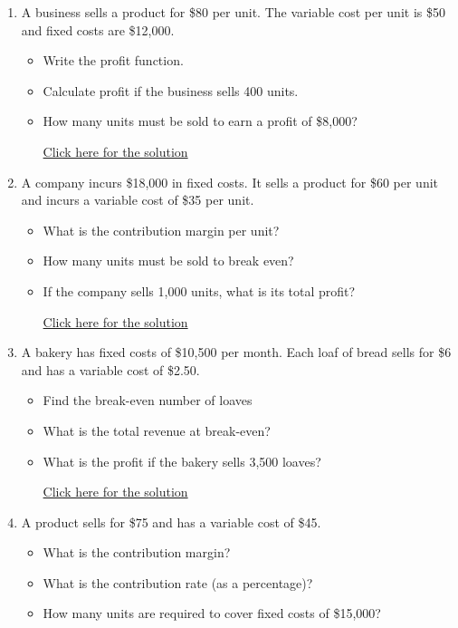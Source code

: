 \documentclass[
]{book}
\providecommand{\tightlist}{%
  \setlength{\itemsep}{0pt}\setlength{\parskip}{0pt}}
\begin{document}
\begin{enumerate}
\def\labelenumi{\arabic{enumi}.}
\tightlist
\item
  A business sells a product for \$80 per unit. The variable cost per unit is \$50 and fixed costs are \$12,000.

  \begin{itemize}
  \tightlist
  \item
    Write the profit function.
  \item
    Calculate profit if the business sells 400 units.
  \item
    How many units must be sold to earn a profit of \$8,000?

    \href{https://youtu.be/ZkAqt5r75JE}{Click here for the solution}
  \end{itemize}
\item
  A company incurs \$18,000 in fixed costs. It sells a product for \$60 per unit and incurs a variable cost of \$35 per unit.

  \begin{itemize}
  \tightlist
  \item
    What is the contribution margin per unit?
  \item
    How many units must be sold to break even?
  \item
    If the company sells 1,000 units, what is its total profit?

    \href{https://youtu.be/IpD_11jJQT8}{Click here for the solution}
  \end{itemize}
\item
  A bakery has fixed costs of \$10,500 per month. Each loaf of bread sells for \$6 and has a variable cost of \$2.50.

  \begin{itemize}
  \tightlist
  \item
    Find the break-even number of loaves
  \item
    What is the total revenue at break-even?
  \item
    What is the profit if the bakery sells 3,500 loaves?

    \href{https://youtu.be/P8KLl_D-kNM}{Click here for the solution}
  \end{itemize}
\item
  A product sells for \$75 and has a variable cost of \$45.

  \begin{itemize}
  \tightlist
  \item
    What is the contribution margin?
  \item
    What is the contribution rate (as a percentage)?
  \item
    How many units are required to cover fixed costs of \$15,000?


\end{itemize}
\end{enumerate}
\end{document}
